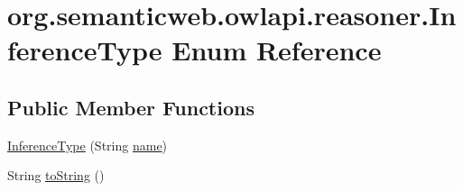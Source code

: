 \hypertarget{enumorg_1_1semanticweb_1_1owlapi_1_1reasoner_1_1_inference_type}{\section{org.\-semanticweb.\-owlapi.\-reasoner.\-Inference\-Type Enum Reference}
\label{enumorg_1_1semanticweb_1_1owlapi_1_1reasoner_1_1_inference_type}
}
\subsection*{Public Member Functions}
\begin{DoxyCompactItemize}
\item 
\hyperlink{enumorg_1_1semanticweb_1_1owlapi_1_1reasoner_1_1_inference_type_a231bd7b632bea27ece632c0d3d85bee0}{Inference\-Type} (String \hyperlink{enumorg_1_1semanticweb_1_1owlapi_1_1reasoner_1_1_inference_type_a925c02403db9376662ee956ff451fac2}{name})
\item 
String \hyperlink{enumorg_1_1semanticweb_1_1owlapi_1_1reasoner_1_1_inference_type_a3b519a0664d13086eb79e6240b798b7b}{to\-String} ()
\end{DoxyCompactItemize}
